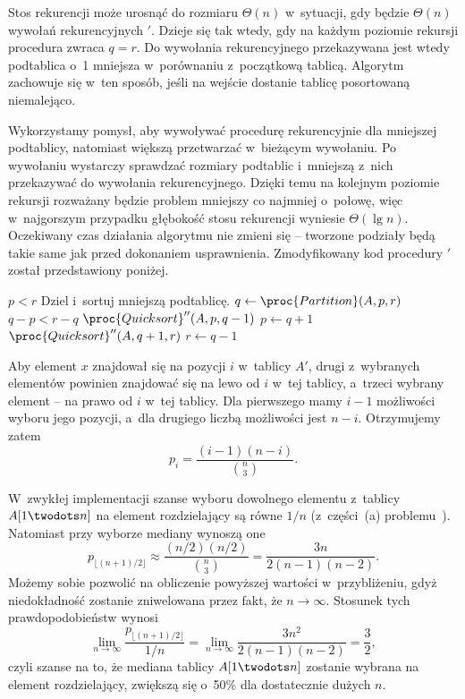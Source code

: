 \subproblem %
Stos rekurencji może urosnąć do rozmiaru $\Theta(n)$ w~sytuacji, gdy będzie $\Theta(n)$ wywołań rekurencyjnych $'$. Dzieje się tak wtedy, gdy na każdym poziomie rekursji procedura  zwraca $q=r$. Do wywołania rekurencyjnego przekazywana jest wtedy podtablica o~1 mniejsza w~porównaniu z~początkową tablicą. Algorytm zachowuje się w~ten sposób, jeśli na wejście dostanie tablicę posortowaną niemalejąco.

\subproblem %
Wykorzystamy pomysł, aby wywoływać procedurę rekurencyjnie dla mniejszej podtablicy, natomiast większą przetwarzać w~bieżącym wywołaniu. Po wywołaniu  wystarczy sprawdzać rozmiary podtablic i~mniejszą z~nich przekazywać do wywołania rekurencyjnego. Dzięki temu na kolejnym poziomie rekursji rozważany będzie problem mniejszy co najmniej o~połowę, więc w~najgorszym przypadku głębokość stosu rekurencji wyniesie $\Theta(\lg n)$. Oczekiwany czas działania algorytmu nie zmieni się -- tworzone podziały będą takie same jak przed dokonaniem usprawnienia. Zmodyfikowany kod procedury $'$ został przedstawiony poniżej.
\begin{codebox}
\li	\While $p<r$
\li		\Do
			\Comment Dziel i~sortuj mniejszą podtablicę.
\li			$q\gets\proc{Partition}(A,p,r)$
\li			\If $q-p<r-q$
\li				\Then
					$\proc{Quicksort}''(A,p,q-1)$
\li					$p\gets q+1$
\li				\Else
					$\proc{Quicksort}''(A,q+1,r)$
\li					$r\gets q-1$
				\End
		\End
\end{codebox}


\subproblem %
Aby element $x$ znajdował się na pozycji $i$ w~tablicy $A'$, drugi z~wybranych elementów powinien znajdować się na lewo od $i$ w~tej tablicy, a~trzeci wybrany element -- na prawo od $i$ w~tej tablicy. Dla pierwszego mamy $i-1$ możliwości wyboru jego pozycji, a~dla drugiego liczbą możliwości jest $n-i$. Otrzymujemy zatem
\[
	p_i = \frac{(i-1)(n-i)}{\binom{n}{3}}.
\]

\subproblem %
W~zwykłej implementacji szanse wyboru dowolnego elementu z~tablicy $A[1\twodots n]$ na element rozdzielający są równe $1/n$ (z~części~(a) problemu~). Natomiast przy wyborze mediany wynoszą one
\[
	p_{\lfloor(n+1)/2\rfloor} \approx \frac{(n/2)(n/2)}{\binom{n}{3}} = \frac{3n}{2(n-1)(n-2)}.
\]
Możemy sobie pozwolić na obliczenie powyższej wartości w~przybliżeniu, gdyż niedokładność zostanie zniwelowana przez fakt, że $n\to\infty$. Stosunek tych prawdopodobieństw wynosi
\[
	\lim_{n\to\infty}\frac{p_{\lfloor(n+1)/2\rfloor}}{1/n} = \lim_{n\to\infty}\frac{3n^2}{2(n-1)(n-2)} = \frac{3}{2},
\]
czyli szanse na to, że mediana tablicy $A[1\twodots n]$ zostanie wybrana na element rozdzielający, zwiększą się o~50\% dla dostatecznie dużych $n$.

